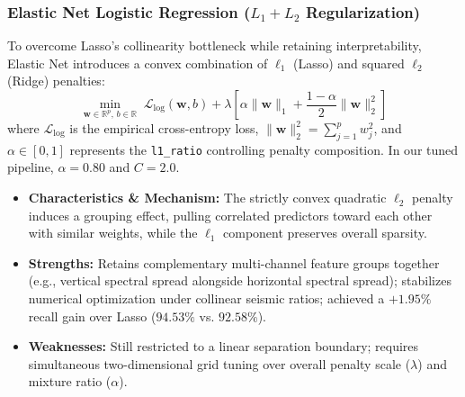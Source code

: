 \documentclass[11pt,a4paper]{article}
\begin{document}
\subsubsection{Elastic Net Logistic Regression (\texorpdfstring{$L_1 + L_2$}{L1 + L2} Regularization)}
To overcome Lasso's collinearity bottleneck while retaining interpretability, Elastic Net introduces a convex combination of $\ell_1$ (Lasso) and squared $\ell_2$ (Ridge) penalties:
\begin{equation*}
    \min_{\mathbf{w} \in \mathbb{R}^p, \, b \in \mathbb{R}} \; \mathcal{L}_{\text{log}}(\mathbf{w}, b) + \lambda \left[ \alpha \|\mathbf{w}\|_1 + \frac{1 - \alpha}{2} \|\mathbf{w}\|_2^2 \right]
\end{equation*}
where $\mathcal{L}_{\text{log}}$ is the empirical cross-entropy loss, $\|\mathbf{w}\|_2^2 = \sum_{j=1}^p w_j^2$, and $\alpha \in [0, 1]$ represents the \texttt{l1\_ratio} controlling penalty composition. In our tuned pipeline, $\alpha = 0.80$ and $C = 2.0$.
\begin{itemize}\setlength{\itemsep}{1.5pt}\setlength{\parskip}{0pt}
    \item \textbf{Characteristics \& Mechanism:} The strictly convex quadratic $\ell_2$ penalty induces a grouping effect, pulling correlated predictors toward each other with similar weights, while the $\ell_1$ component preserves overall sparsity.
    \item \textbf{Strengths:} Retains complementary multi-channel feature groups together (e.g., vertical spectral spread alongside horizontal spectral spread); stabilizes numerical optimization under collinear seismic ratios; achieved a $+1.95\%$ recall gain over Lasso ($94.53\%$ vs. $92.58\%$).
    \item \textbf{Weaknesses:} Still restricted to a linear separation boundary; requires simultaneous two-dimensional grid tuning over overall penalty scale ($\lambda$) and mixture ratio ($\alpha$).
\end{itemize}
\end{document}
